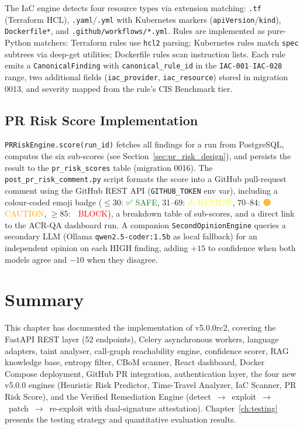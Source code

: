 The IaC engine detects four resource types via extension matching: \texttt{.tf} (Terraform HCL), \texttt{.yaml}/\texttt{.yml} with Kubernetes markers (\texttt{apiVersion}/\texttt{kind}), \texttt{Dockerfile*}, and \texttt{.github/workflows/*.yml}. Rules are implemented as pure-Python matchers: Terraform rules use \texttt{hcl2} parsing; Kubernetes rules match \texttt{spec} subtrees via deep-get utilities; Dockerfile rules scan instruction lists. Each rule emits a \texttt{CanonicalFinding} with \texttt{canonical\_rule\_id} in the \texttt{IAC-001}--\texttt{IAC-028} range, two additional fields (\texttt{iac\_provider}, \texttt{iac\_resource}) stored in migration 0013, and severity mapped from the rule's CIS Benchmark tier.

\subsection{PR Risk Score Implementation}

\texttt{PRRiskEngine.score(run\_id)} fetches all findings for a run from PostgreSQL, computes the six sub-scores (see Section~\ref{sec:pr_risk_design}), and persists the result to the \texttt{pr\_risk\_scores} table (migration 0016). The \texttt{post\_pr\_risk\_comment.py} script formats the score into a GitHub pull-request comment using the GitHub REST API (\texttt{GITHUB\_TOKEN} env var), including a colour-coded emoji badge ($\leq$30: \textcolor{green}{✅ SAFE}, 31--69: \textcolor{yellow}{⚠ REVIEW}, 70--84: \textcolor{orange}{🟠 CAUTION}, $\geq$85: \textcolor{red}{🔴 BLOCK}), a breakdown table of sub-scores, and a direct link to the ACR-QA dashboard run. A companion \texttt{SecondOpinionEngine} queries a secondary LLM (Ollama \texttt{qwen2.5-coder:1.5b} as local fallback) for an independent opinion on each HIGH finding, adding $+15$ to confidence when both models agree and $-10$ when they disagree.

\section{Summary}

This chapter has documented the implementation of \ACRQA{} v5.0.0rc2, covering the FastAPI REST layer (52 endpoints), Celery asynchronous workers, language adapters, taint analyser, call-graph reachability engine, confidence scorer, RAG knowledge base, entropy filter, CBoM scanner, React dashboard, Docker Compose deployment, GitHub PR integration, authentication layer, the four new v5.0.0 engines (Heuristic Risk Predictor, Time-Travel Analyzer, IaC Scanner, PR Risk Score), and the Verified Remediation Engine (detect~$\to$~exploit~$\to$~patch~$\to$~re-exploit with dual-signature attestation). Chapter~\ref{ch:testing} presents the testing strategy and quantitative evaluation results.

\clearpage
